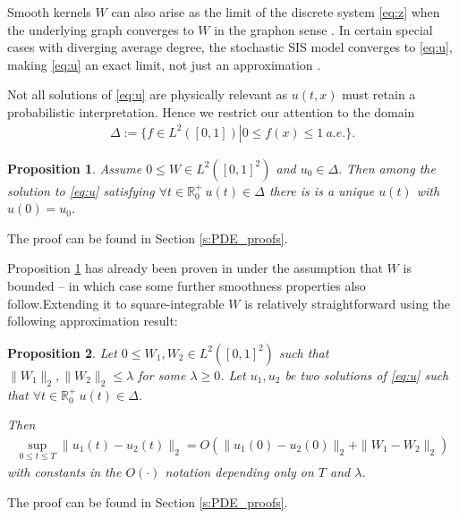 \documentclass{article}
\newcommand{\1}[1]{{\mathds{1}}_{\left\{#1\right\}}}
\newtheorem{prop}{Proposition}
\newcommand{\rem}[1]{{#1}}
\begin{document}
Smooth kernels $W$ can also arise as the limit of the discrete system \eqref{eq:z} when the underlying graph converges to $W$ in the graphon sense \cite{lovaszbook,graphonL2conv}. In certain special cases with diverging average degree, the stochastic SIS model converges to \eqref{eq:u}, making \eqref{eq:u} an exact limit, not just an approximation \cite{gl}.

Not all solutions of \eqref{eq:u} are physically relevant as $u(t,x)$ must retain a probabilistic interpretation. Hence we restrict our attention to the domain
\begin{align}
\label{eq:Delta}
\Delta:=\{ \left. f \in L^2([0,1]) \right| 0 \leq f(x) \leq 1 \ a.e. \}.
\end{align}


\begin{prop}
\label{t:PDE_basics}
Assume $0 \leq W \in L^2\left([0,1]^2\right)$ and $u_0 \in \Delta.$ Then among the solution to \eqref{eq:u} satisfying $\forall t \in \mathbb{R}_{0}^{+} \ u(t) \in \Delta$ there is is a unique $u(t)$ with $u(0)=u_0$. 
\end{prop}
\rem{The proof can be found in Section \ref{s:PDE_proofs}.}


Proposition \ref{t:PDE_basics} has already been proven in \cite[Proposition 2.9. (ii)]{SISdyn} under the assumption that $W$ is bounded -- in which case some further smoothness properties also follow.Extending it to square-integrable $W$ is relatively straightforward using the following approximation result:
\begin{prop}
\label{t:approx}
Let $0 \leq W_1,W_2 \in L^2\left([0,1]^2\right)$ such that $\|W_1 \|_2, \| W_2\|_2 \leq \lambda $ for some $\lambda \geq 0$. Let $u_1,u_2$ be two solutions of \eqref{eq:u}  such that $\forall t \in \mathbb{R}_{0}^{+} \ u(t) \in \Delta.$

Then 
\begin{align}
\label{eq:approx}
\sup_{0 \leq t \leq T} \|u_1(t)-u_2(t)\|_2 =O\left(\|u_1(0)-u_2(0) \|_2+\|W_1-W_2 \|_2 \right)
\end{align}
with constants in the $O(\cdot)$ notation depending only on $T$ and $\lambda$.
\end{prop}
\rem{The proof can be found in Section \ref{s:PDE_proofs}.}
\end{document}
